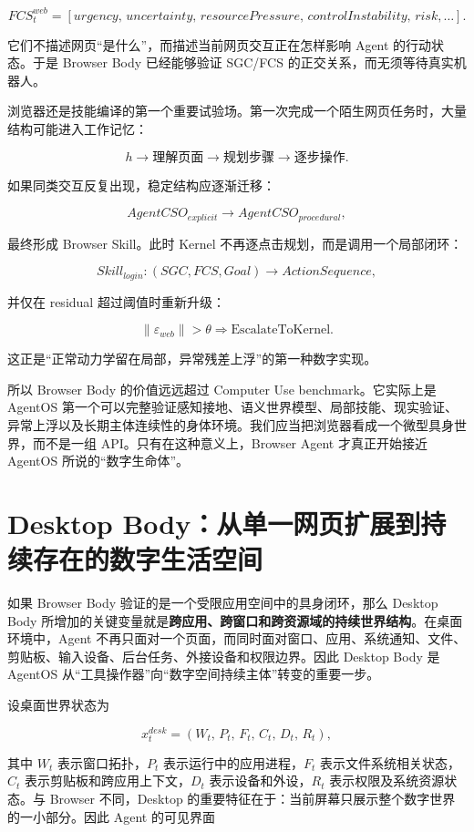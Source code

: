 $$
FCS_t^{web}
=
[
urgency,\,
uncertainty,\,
resourcePressure,\,
controlInstability,\,
risk,\ldots
].
$$

它们不描述网页“是什么”，而描述当前网页交互正在怎样影响 Agent 的行动状态。于是 Browser Body 已经能够验证 SGC/FCS 的正交关系，而无须等待真实机器人。

浏览器还是技能编译的第一个重要试验场。第一次完成一个陌生网页任务时，大量结构可能进入工作记忆：

$$
h\rightarrow
\text{理解页面}\rightarrow
\text{规划步骤}\rightarrow
\text{逐步操作}.
$$

如果同类交互反复出现，稳定结构应逐渐迁移：

$$
AgentCSO_{explicit}
\rightarrow
AgentCSO_{procedural},
$$

最终形成 Browser Skill。此时 Kernel 不再逐点击规划，而是调用一个局部闭环：

$$
Skill_{login}
:
(SGC,FCS,Goal)
\rightarrow
ActionSequence,
$$

并仅在 residual 超过阈值时重新升级：

$$
\|\varepsilon_{web}\|>\theta
\Rightarrow
\mathrm{EscalateToKernel}.
$$

这正是“正常动力学留在局部，异常残差上浮”的第一种数字实现。

所以 Browser Body 的价值远远超过 Computer Use benchmark。它实际上是 AgentOS 第一个可以完整验证感知接地、语义世界模型、局部技能、现实验证、异常上浮以及长期主体连续性的身体环境。我们应当把浏览器看成一个微型具身世界，而不是一组 API。只有在这种意义上，Browser Agent 才真正开始接近 AgentOS 所说的“数字生命体”。

\section{Desktop Body：从单一网页扩展到持续存在的数字生活空间}

如果 Browser Body 验证的是一个受限应用空间中的具身闭环，那么 Desktop Body 所增加的关键变量就是\textbf{跨应用、跨窗口和跨资源域的持续世界结构}。在桌面环境中，Agent 不再只面对一个页面，而同时面对窗口、应用、系统通知、文件、剪贴板、输入设备、后台任务、外接设备和权限边界。因此 Desktop Body 是 AgentOS 从“工具操作器”向“数字空间持续主体”转变的重要一步。

设桌面世界状态为

$$
x_t^{desk}
=
(
W_t,\,
P_t,\,
F_t,\,
C_t,\,
D_t,\,
R_t
),
$$

其中 $W_t$ 表示窗口拓扑，$P_t$ 表示运行中的应用进程，$F_t$ 表示文件系统相关状态，$C_t$ 表示剪贴板和跨应用上下文，$D_t$ 表示设备和外设，$R_t$ 表示权限及系统资源状态。与 Browser 不同，Desktop 的重要特征在于：当前屏幕只展示整个数字世界的一小部分。因此 Agent 的可见界面

